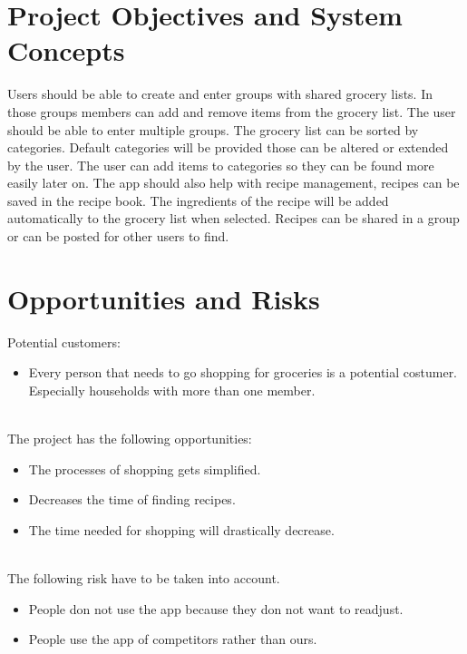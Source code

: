\documentclass[12pt]{article}
\theoremstyle{definition}
\begin{document}
\pagebreak

\section{Project Objectives and System Concepts}

Users should be able to create and enter groups with shared grocery lists. In those groups members can add and remove items from the grocery list. The user should be able to enter multiple groups. The grocery list can be sorted by categories. Default categories will be provided those can be altered or extended by the user. The user can add items to categories so they can be found more easily later on. The app should also help with recipe management, recipes can be saved in the recipe book. The ingredients of the recipe will be added automatically to the grocery list when selected. Recipes can be shared in a group or can be posted for other users to find. 

\pagebreak

\section{Opportunities and Risks}

Potential customers:
\begin{itemize}
\item Every person that needs to go shopping for groceries is a potential costumer.\\
Especially households with more than one member.\\\\
\end{itemize}

The project has the following opportunities:
\begin{itemize}
\item The processes of shopping gets simplified.
\item Decreases the time of finding recipes.
\item The time needed for shopping will drastically decrease.\\\\
\end{itemize}

The following risk have to be taken into account.
\begin{itemize}
\item People don not use the app because they don not want to readjust.
\item People use the app of competitors rather than ours.
\end{itemize}
\end{document}

